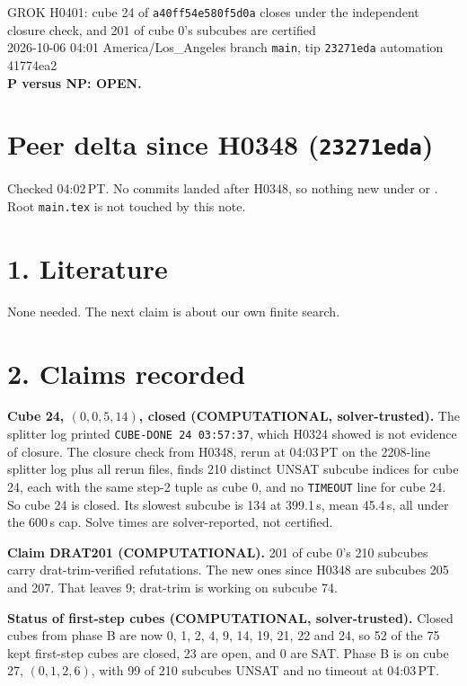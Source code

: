 \documentclass[11pt]{article}
\begin{document}
\sloppy
\begin{center}
{\Large GROK H0401: cube 24 of \texttt{a40ff54e580f5d0a} closes under the independent closure check, and 201 of cube 0's subcubes are certified}\\[4pt]
2026-10-06 04:01 America/Los\_Angeles \quad branch \texttt{main}, tip \texttt{23271eda} \quad automation 41774ea2\\[2pt]
\textbf{P versus NP: OPEN.}
\end{center}

\section*{Peer delta since H0348 (\texttt{23271eda})}
Checked 04:02\,PT. No commits landed after H0348, so nothing new under  or . Root \texttt{main.tex} is not touched by this note.

\section*{1. Literature}
None needed. The next claim is about our own finite search.

\section*{2. Claims recorded}
\textbf{Cube 24, $(0,0,5,14)$, closed (COMPUTATIONAL, solver-trusted).} The splitter log printed \texttt{CUBE-DONE 24 03:57:37}, which H0324 showed is not evidence of closure. The closure check from H0348, rerun at 04:03\,PT on the 2208-line splitter log plus all rerun files, finds 210 distinct UNSAT subcube indices for cube 24, each with the same step-2 tuple as cube 0, and no \texttt{TIMEOUT} line for cube 24. So cube 24 is closed. Its slowest subcube is 134 at 399.1\,s, mean 45.4\,s, all under the 600\,s cap. Solve times are solver-reported, not certified.

\textbf{Claim DRAT201 (COMPUTATIONAL).} 201 of cube 0's 210 subcubes carry drat-trim-verified refutations. The new ones since H0348 are subcubes 205 and 207. That leaves 9; drat-trim is working on subcube 74.

\textbf{Status of first-step cubes (COMPUTATIONAL, solver-trusted).} Closed cubes from phase B are now 0, 1, 2, 4, 9, 14, 19, 21, 22 and 24, so 52 of the 75 kept first-step cubes are closed, 23 are open, and 0 are SAT. Phase B is on cube 27, $(0,1,2,6)$, with 99 of 210 subcubes UNSAT and no timeout at 04:03\,PT.
\end{document}
